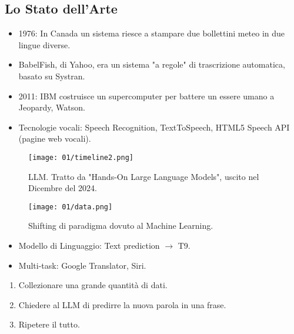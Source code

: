 \subsection{Lo Stato dell'Arte}

\begin{itemize}
  \item 1976: In Canada un sistema riesce a stampare due bollettini meteo in due lingue diverse. \item BabelFish, di Yahoo, era un sistema "a regole" di trascrizione automatica, basato su Systran.
  \item 2011: IBM costruisce un supercomputer per battere un essere umano a Jeopardy, Watson.  
  \item Tecnologie vocali: Speech Recognition, TextToSpeech, HTML5 Speech API (pagine web vocali).
\end{itemize}


\begin{figure}[h]
    \centering
    \texttt{[image: 01/timeline2.png]}
    \caption{LLM. Tratto da "Hands-On Large Language Models", uscito nel Dicembre del 2024.}
\end{figure}


\begin{figure}[h]
    \centering
    \texttt{[image: 01/data.png]}
    \caption{Shifting di paradigma dovuto al Machine Learning.}
\end{figure}


\begin{itemize}
  \item Modello di Linguaggio: Text prediction $\rightarrow$ T9. 
  \item Multi-task: Google Translator, Siri.
\end{itemize}


\begin{enumerate}
  \item Collezionare una grande quantità di dati. 
  \item Chiedere al LLM di predirre la nuova parola in una frase. 
  \item Ripetere il tutto.
\end{enumerate}

